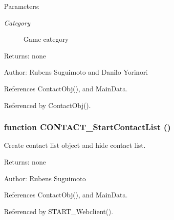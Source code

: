 \begin{Desc}
\item[Parameters:]
\begin{description}
\item[{\em Category}]Game category \end{description}
\end{Desc}
\begin{Desc}
\item[Returns:]none \end{Desc}
\begin{Desc}
\item[Author:]Rubens Suguimoto and Danilo Yorinori \end{Desc}


References ContactObj(), and MainData.

Referenced by ContactObj().
\subsubsection[CONTACT\_\-StartContactList]{\setlength{\rightskip}{0pt plus 5cm}function CONTACT\_\-StartContactList ()}\label{contact_2contact_8js_48c571fee1429689401d88502dce63ec}


Create contact list object and hide contact list. 

\begin{Desc}
\item[Returns:]none \end{Desc}
\begin{Desc}
\item[Author:]Rubens Suguimoto \end{Desc}


References ContactObj(), and MainData.

Referenced by START\_\-Webclient().